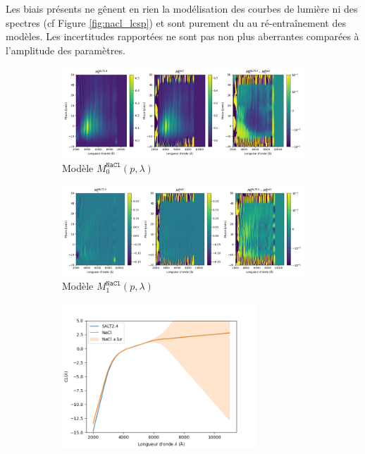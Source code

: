 \documentclass{book}
\def\nacl{\texttt{NaCl}\xspace}
\begin{document}
Les biais présents ne gênent en rien la modélisation des courbes de lumière ni des spectres (cf Figure \ref{fig:nacl_lcsp}) et sont purement du au ré-entraînement des modèles. Les incertitudes rapportées ne sont pas non plus aberrantes comparées à l'amplitude des paramètres.

\begin{figure}[h]
	\centering
	\begin{subfigure}{0.9\textwidth}
		\centering
		\includegraphics[width=\textwidth]{figures/nacl_m0.png}
		\caption{Modèle $M_0^{\nacl}(p, \lambda)$}
		\label{fig:nacl_m0}
	\end{subfigure}
	\hfill
	\begin{subfigure}{0.9\textwidth}
		\centering
		\includegraphics[width=\textwidth]{figures/nacl_m1.png}
		\caption{Modèle $M_1^{\nacl}(p, \lambda)$}
		\label{fig:nacl_m1}
	\end{subfigure}
	\hfill	
	\begin{subfigure}[c]{0.35\textwidth}
		\centering
		\includegraphics[width=0.8\textwidth]{figures/nacl_cl.png}

\end{subfigure}
\end{figure}
\end{document}
